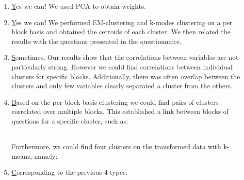 \documentclass{article}
\begin{document}
\begin{enumerate}
  \item \href{qs:aggregation} Yes we can! We used PCA to obtain weights.

  \item \href{qs:blockCluster} Yes we can! We performed EM-clustering and k-modes clustering on a per block basis and obtained the cetroids of each cluster. We then related the results with the questions presented in the questionnaire.

  \item \href{qs:blockCorrelations} Sometimes. Our results show that the correlations between variables are not particularly strong. However we could find correlations between individual clusters for specific blocks. Additionally, there was often overlap between the clusters and only few variables clearly separated a cluster from the others.

  \item \href{qs:types} Based on the per-block basis clustering we could find pairs of clusters correlated over multiple blocks. This established a link between blocks of questions for a specific cluster, such as:
    \\
    Furthermore, we could find four clusters on the transformed data with k-means, namely:

  \item \href{qs:personal} Corresponding to the previous 4 types:
\end{enumerate}
\end{document}

